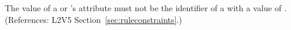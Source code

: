 The value of a \RateRule or \AssignmentRule's  attribute must not be the identifier of a \Compartment with a  value of .
(References: L2V5 Section~\ref{sec:ruleconstraints}.)
